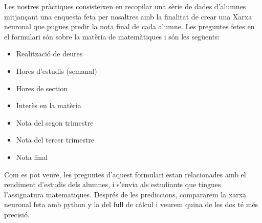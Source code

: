 Les nostres pràctiques consisteixen en recopilar una sèrie de dades d'alumnes mitjançant una enquesta feta per nosaltres amb la finalitat de crear una Xarxa neuronal que pugues predir la nota final de cada alumne. Les preguntes fetes en el formulari són sobre la matèria de matemàtiques i són les següents:
\begin{itemize}
 \item Realització de deures
 \item Hores d'estudis (semanal)
 \item Hores de section
 \item Interès en la matèria
 \item Nota del segon trimestre
 \item Nota del tercer trimestre
 \item Nota final
\end{itemize}
Com es pot veure, les preguntes d'aquest formulari estan relacionades amb el rendiment d'estudis dels alumnes, i s'envia als estudiants que tingues l'assignatura matematiques.
Després de les prediccions, compararem la xarxa neuronal feta amb python y la del full de càlcul i veurem quina de les dos té més precisió.
